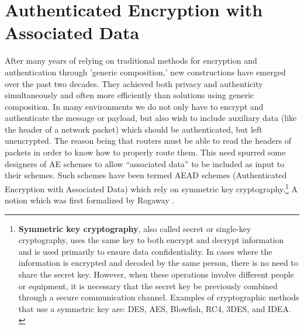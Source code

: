 \section{Authenticated Encryption with Associated Data}
After many years of relying on traditional methods for encryption and authentication through 'generic composition,' new constructions have emerged over the past two decades. They achieved both privacy and authenticity simultaneously and often more efficiently than solutions using generic composition.
\newline
In many environments we do not only have to encrypt and authenticate the message or payload, but also wish to include auxiliary data (like the header of a network packet) which should be authenticated, but left unencrypted. \cite[Chapter 1]{Black2005}
The reason being that routers must be able to read the headers of packets in order to know how to properly route them. This need spurred some designers of AE schemes to allow “associated data” to be included as input to their schemes. Such schemes have been termed AEAD schemes (Authenticated Encryption with Associated Data) which rely on symmetric key cryptography.\footnote[1]{\textbf{Symmetric key cryptography}, also called secret or single-key cryptography, uses the same key to both encrypt and decrypt information and is used primarily to ensure data confidentiality. In cases where the information is encrypted and decoded by the same person, there is no need to share the secret key. However, when these operations involve different people or equipment, it is necessary that the secret key be previously combined through a secure communication channel. Examples of cryptographic methods that use a symmetric key are: DES, AES, Blowfish, RC4, 3DES, and IDEA. \cite{Alencar2022Cryptography}}
A notion which was first formalized by Rogaway \cite{10.1145/586110.586125}.


